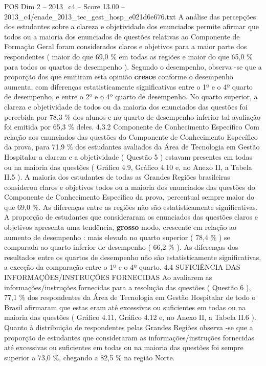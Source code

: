\begin{textsample}{POS Dim 2 – 2013\_c4 – Score 13.00 – 2013\_c4/enade\_2013\_tec\_gest\_hosp\_e021d6e676.txt}
A análise das percepções dos estudantes sobre a clareza e objetividade dos enunciados permite afirmar que todos ou a maioria dos enunciados de questões relativas ao Componente de Formação Geral foram considerados claros e objetivos para a maior parte dos respondentes ( maior do que 69,0 \% em todas as regiões e maior do que 65,0 \% para todos os quartos de desempenho ).
Segundo o desempenho, observa -se que a proporção dos que emitiram esta opinião \textbf{cresce} conforme o desempenho aumenta, com diferenças estatisticamente significativas entre o 1º e o 4º quarto de desempenho, e entre o 2º e o 4º quarto de desempenho.
No quarto superior, a clareza e objetividade de todos ou da maioria dos enunciados das questões foi percebida por 78,3 \% dos alunos e no quarto de desempenho inferior tal avaliação foi emitida por 65,3 \% deles. 4.3.2 Componente de Conhecimento Específico Com relação aos enunciados das questões do Componente de Conhecimento Específico da prova, para 71,9 \% dos estudantes avaliados da Área de Tecnologia em Gestão Hospitalar a clareza e a objetividade ( Questão 5 ) estavam presentes em todas ou na maioria das questões ( Gráfico 4.9, Gráfico 4.10 e, no Anexo II, a Tabela II.5 ).
A maioria dos estudantes de todas as Grandes Regiões brasileiras considerou claros e objetivos todos ou a maioria dos enunciados das questões do Componente de Conhecimento Específico da prova, percentual sempre maior do que 69,0 \%.
As diferenças entre as regiões não são estatisticamente significativas.
A proporção de estudantes que consideraram os enunciados das questões claros e objetivos apresenta uma tendência, \textbf{grosso} modo, crescente em relação ao aumento de desempenho : mais elevada no quarto superior ( 78,4 \% ) se comparada ao quarto inferior de desempenho ( 66,2 \% ).
As diferenças dos resultados entre os quartos de desempenho não são estatisticamente significativas, a exceção da comparação entre o 1º e o 4º quarto. 4.4 SUFICIÊNCIA DAS INFORMAÇÕES/INSTRUÇÕES FORNECIDAS Ao avaliarem as informações/instruções fornecidas para a resolução das questões ( Questão 6 ), 77,1 \% dos respondentes da Área de Tecnologia em Gestão Hospitalar de todo o Brasil afirmaram que estas eram até excessivas ou suficientes em todas ou na maioria das questões ( Gráfico 4.11, Gráfico 4.12 e, no Anexo II, a Tabela II.6 ).
Quanto à distribuição de respondentes pelas Grandes Regiões observa -se que a proporção de estudantes que consideraram as informações/instruções fornecidas até excessivas ou suficientes em todas ou na maioria das questões foi sempre superior a 73,0 \%, chegando a 82,5 \% na região Norte.

\end{textsample}

